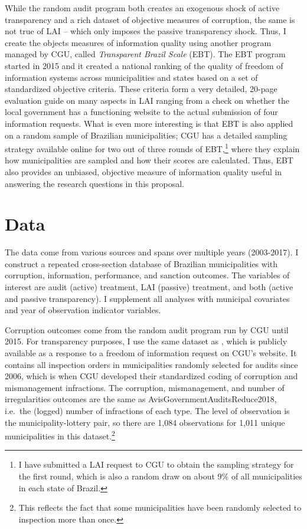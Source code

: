 \documentclass[11pt]{article}
\begin{document}
While the random audit program both creates an exogenous shock of active transparency and a rich dataset of objective measures of corruption, the same is not true of LAI -- which only imposes the passive transparency shock. Thus, I create the objects measures of information quality using another program managed by CGU, called \emph{Transparent Brazil Scale} (EBT). The EBT program started in 2015 and it created a national ranking of the quality of freedom of information systems across municipalities and states based on a set of standardized objective criteria. These criteria form a very detailed, 20-page evaluation guide on many aspects in LAI ranging from a check on whether the local government has a functioning website to the actual submission of four information requests. What is even more interesting is that EBT is also applied on a random sample of Brazilian municipalities; CGU has a detailed sampling strategy available online for two out of three rounds of EBT,\footnote{I have submitted a LAI request to CGU to obtain the sampling strategy for the first round, which is also a random draw on about 9\% of all municipalities in each state of Brazil.} where they explain how municipalities are sampled and how their scores are calculated. Thus, EBT also provides an unbiased, objective measure of information quality useful in answering the research questions in this proposal.

\section{Data} \label{sec:data_paper3}

The data come from various sources and spans over multiple years (2003-2017). I construct a repeated cross-section database of Brazilian municipalities with corruption, information, performance, and sanction outcomes. The variables of interest are audit (active) treatment, LAI (passive) treatment, and both (active and passive transparency). I supplement all analyses with municipal covariates and year of observation indicator variables.

Corruption outcomes come from the random audit program run by CGU until 2015. For transparency purposes, I use the same dataset as \citet{AvisGovernmentAuditsReduce2018}, which is publicly available as a response to a freedom of information request on CGU's website. It contains all inspection orders in municipalities randomly selected for audits since 2006, which is when CGU developed their standardized coding of corruption and mismanagement infractions. The corruption, mismanagement, and number of irregularities outcomes are the same as {AvisGovernmentAuditsReduce2018}, i.e.~the (logged) number of infractions of each type. The level of observation is the municipality-lottery pair, so there are 1,084 observations for 1,011 unique municipalities in this dataset.\footnote{This reflects the fact that some municipalities have been randomly selected to inspection more than once.}
\end{document}
